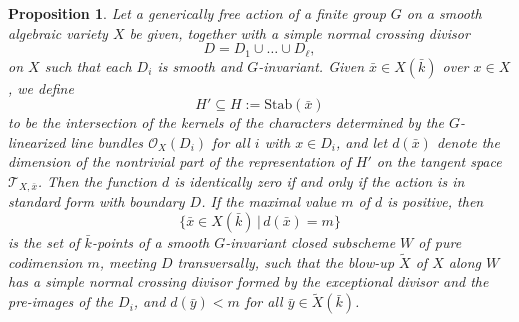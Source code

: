\documentclass[10pt,a4paper]{amsart}
\newtheorem{prop}{Proposition}
\newcommand{\cO}{{\mathcal O}}
\newcommand{\cT}{{\mathcal T}}
\begin{document}
\begin{prop}
\label{prop.divisorial}
Let a generically free action of a finite group $G$ on a smooth algebraic variety $X$ be given, together with a simple normal crossing divisor
\[ D=D_1\cup\dots\cup D_\ell, \]
on $X$ such that each $D_i$ is smooth and $G$-invariant.
Given $\bar x\in X(\bar k)$ over $x\in X$, we define
\[ H'\subseteq H:=\mathrm{Stab}(\bar x) \]
to be the intersection of the kernels of the characters determined by the $G$-linearized line bundles $\cO_X(D_i)$ for all $i$ with $x\in D_i$, and let $d(\bar x)$ denote the dimension of the nontrivial part of the representation of $H'$ on the tangent space $\cT_{X,\bar x}$.
Then the function $d$ is identically zero if and only if the action is in standard form with boundary $D$.
If the maximal value $m$ of $d$ is positive, then
\[ \{\bar x\in X(\bar k)\,|\, d(\bar x)=m\} \]
is the set of $\bar k$-points of a smooth $G$-invariant closed subscheme $W$ of pure codimension $m$, meeting $D$ transversally, such that the blow-up $\widetilde{X}$ of $X$ along $W$ has a simple normal crossing divisor formed by the exceptional divisor and the pre-images of the $D_i$, and $d(\bar y)<m$ for all $\bar y\in \widetilde{X}(\bar k)$.
\end{prop}
\end{document}
